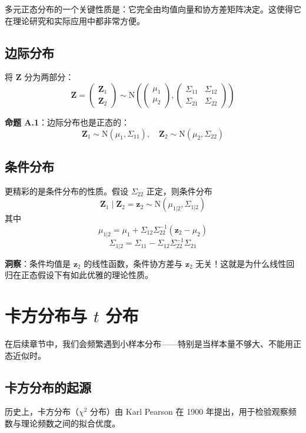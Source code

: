 多元正态分布的一个关键性质是：它完全由均值向量和协方差矩阵决定。这使得它在理论研究和实际应用中都非常方便。

\subsection{边际分布}

将 $\mathbf{Z}$ 分为两部分：
\[
\mathbf{Z} = \begin{pmatrix} \mathbf{Z}_1 \\ \mathbf{Z}_2 \end{pmatrix}
\sim \mathrm{N}\left(
\begin{pmatrix} \mu_1 \\ \mu_2 \end{pmatrix},
\begin{pmatrix} \Sigma_{11} & \Sigma_{12} \\ \Sigma_{21} & \Sigma_{22} \end{pmatrix}
\right)
\]

\textbf{命题 A.1}：边际分布也是正态的：
\[
\mathbf{Z}_1 \sim \mathrm{N}(\mu_1, \Sigma_{11}), \quad \mathbf{Z}_2 \sim \mathrm{N}(\mu_2, \Sigma_{22})
\]

\subsection{条件分布}

更精彩的是条件分布的性质。假设 $\Sigma_{22}$ 正定，则条件分布
\[
\mathbf{Z}_1 \mid \mathbf{Z}_2 = \mathbf{z}_2 \sim \mathrm{N}(\mu_{1|2}, \Sigma_{1|2})
\]
其中
\[
\mu_{1|2} = \mu_1 + \Sigma_{12}\Sigma_{22}^{-1}(\mathbf{z}_2 - \mu_2)
\]
\[
\Sigma_{1|2} = \Sigma_{11} - \Sigma_{12}\Sigma_{22}^{-1}\Sigma_{21}
\]

\textbf{洞察}：条件均值是 $\mathbf{z}_2$ 的线性函数，条件协方差与 $\mathbf{z}_2$ 无关！这就是为什么线性回归在正态假设下有如此优雅的理论性质。

\section{卡方分布与 $t$ 分布}\label{sec:chi-square-t}

在后续章节中，我们会频繁遇到小样本分布——特别是当样本量不够大、不能用正态近似时。

\subsection{卡方分布的起源}

历史上，卡方分布（$\chi^2$ 分布）由 Karl Pearson 在 1900 年提出，用于检验观察频数与理论频数之间的拟合优度。

